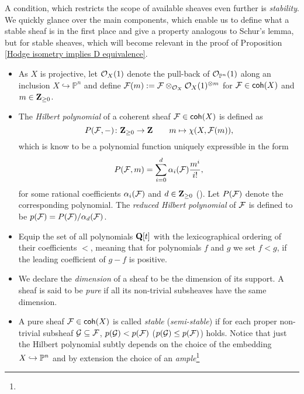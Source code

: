 A condition, which restricts the scope of available sheaves even further is \emph{stability}. We quickly glance over the main components, which enable us to define what a stable sheaf is in the first place and give a property analogous to Schur's lemma, but for stable sheaves, which will become relevant in the proof of Proposition \ref{Hodge isometry implies D equivalence}.
\begin{itemize}[label = $\vartriangleright$]
    \item{
        As $X$ is projective, let ${\mathcal{O}_{X}}(1)$ denote the pull-back of ${\mathcal{O}_{\mathbb P^n}}(1)$ along an inclusion $X \hookrightarrow \mathbb{P}^n$ and define $\mathcal F(m) := \mathcal F \otimes_{{\mathcal{O}_{X}}} {\mathcal{O}_{X}}(1)^{\otimes m}$ for $\mathcal F \in \mathsf{coh}(X)$ and $m \in \mathbf Z_{\geq 0}$.
        }
    \item{
        The \emph{Hilbert polynomial} of a coherent sheaf $\mathcal F \in \mathsf{coh}(X)$ is defined as
        \[
            P(\mathcal F, -) \colon \mathbf Z_{\geq 0} \to \mathbf Z \qquad m \mapsto \chi(X, \mathcal F(m)),
        \]
        which is know to be a polynomial function uniquely expressible in the form 
        \[
            P(\mathcal F, m) = \sum_{i = 0}^d \alpha_i(\mathcal F)\frac{m^i}{i!},
        \]
        for some rational coefficients $\alpha_i(\mathcal F)$ and $d \in \mathbf Z_{\geq 0}$ (\cf \cite[Part I, \S 1.2, Lemma 1.2.1]{HuybrechtsLehn2010}). Let $P(\mathcal F)$ denote the corresponding polynomial. The \emph{reduced Hilbert polynomial} of $\mathcal F$ is defined to be $p(\mathcal F) = P(\mathcal F)/\alpha_d(\mathcal F)$. 
    }
    \item{
        Equip the set of all polynomials $\mathbf Q[t]$ with the lexicographical ordering of their coefficients $<$, meaning that for polynomials $f$ and $g$ we set $f < g$, if the leading coefficient of $g - f$ is positive. 
    }
    \item{
        We declare the \emph{dimension} of a sheaf to be the dimension of its support.
        A sheaf is said to be \emph{pure} if all its non-trivial subsheaves have the same dimension. 
    }
    \item{
        A pure sheaf $\mathcal F \in \mathsf{coh}(X)$ is called \emph{stable} (\resp \emph{semi-stable}) if for each proper non-trivial subsheaf $\mathcal G \subseteq \mathcal F$, $p(\mathcal G) < p(\mathcal F)$ (\resp $p(\mathcal G) \leq p(\mathcal F)$) holds. Notice that just the Hilbert polynomial subtly depends on the choice of the embedding $X \hookrightarrow \mathbb P^n$ and by extension the choice of an \emph{ample}\footnote{
}}
\end{itemize}
